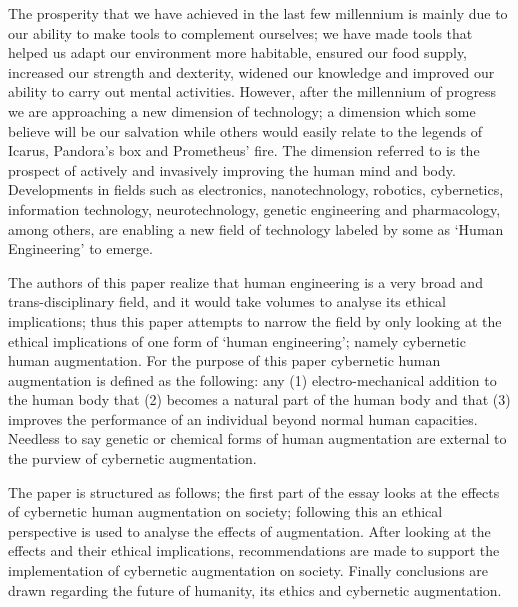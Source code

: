 
The prosperity that we have achieved in the last few millennium is mainly due to our ability to make tools to complement ourselves; we have made tools that helped us adapt our environment more habitable, ensured our food supply, increased our strength and dexterity, widened our knowledge and improved our ability to carry out mental activities. However, after the  millennium of progress we are approaching a new dimension of technology; a dimension which some believe will be our salvation while others would easily relate to the legends of Icarus, Pandora’s box and Prometheus’ fire. The dimension referred to is the prospect of actively and invasively improving the human mind and body. Developments in fields such as electronics, nanotechnology, robotics, cybernetics, information technology, neurotechnology, genetic engineering and pharmacology, among others, are enabling a new field of technology labeled by some as ‘Human Engineering’ to emerge.

The authors of this paper realize that human engineering is a very broad and trans-disciplinary field, and it would take volumes to analyse its ethical implications; thus this paper attempts to narrow the field by only looking at the ethical implications of one form of ‘human engineering’; namely cybernetic human augmentation. For the purpose of this paper cybernetic human augmentation is defined as the following: any (1) electro-mechanical addition to the human body that (2) becomes a natural part of the human body and that (3) improves the performance of an individual beyond normal human capacities. Needless to say genetic or chemical forms of human augmentation are external to the purview of cybernetic augmentation.

The paper is structured as follows; the first part of the essay looks at the effects of cybernetic human augmentation on society; following this an ethical perspective is used to analyse the effects of augmentation. After looking at the effects and their ethical implications, recommendations are made to support the implementation of cybernetic augmentation on society. Finally conclusions are drawn regarding the future of humanity, its ethics and cybernetic augmentation.
